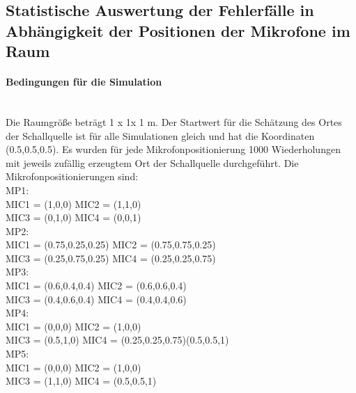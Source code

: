 \subsection{Statistische Auswertung der Fehlerfälle in Abhängigkeit der Positionen der Mikrofone im Raum}\label{sec:Position}
\paragraph{Bedingungen für die Simulation}\ \\ 
Die Raumgröße beträgt 1 x 1x 1 m.
Der Startwert für die Schätzung des Ortes der Schallquelle ist für alle Simulationen gleich und hat die Koordinaten (0.5,0.5,0.5). Es wurden für jede Mikrofonpositionierung 1000 Wiederholungen mit jeweils zufällig erzeugtem Ort der Schallquelle durchgeführt. 
Die Mikrofonpositionierungen sind:\\
MP1:\\
MIC1 = (1,0,0)
MIC2 = (1,1,0)\\
MIC3 = (0,1,0)
MIC4 = (0,0,1)\\
MP2:\\
MIC1 = (0.75,0.25,0.25)
MIC2 = (0.75,0.75,0.25)\\
MIC3 = (0.25,0.75,0.25)
MIC4 = (0.25,0.25,0.75)\\
MP3:\\
MIC1 = (0.6,0.4,0.4)
MIC2 = (0.6,0.6,0.4)\\
MIC3 = (0.4,0.6,0.4)
MIC4 = (0.4,0.4,0.6)\\ 
MP4:\\
MIC1 = (0,0,0)
MIC2 = (1,0,0)\\
MIC3 = (0.5,1,0)
MIC4 = (0.25,0.25,0.75)(0.5,0.5,1)\\
MP5:\\
MIC1 = (0,0,0)
MIC2 = (1,0,0)\\
MIC3 = (1,1,0)
MIC4 = (0.5,0.5,1)\\
